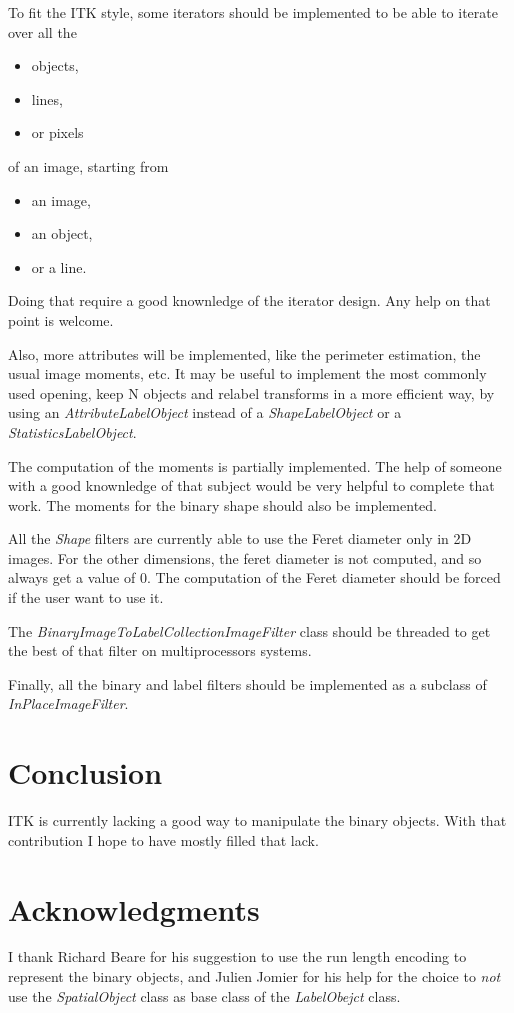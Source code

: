 \documentclass{InsightArticle}
\begin{document}
To fit the ITK style, some iterators should be implemented to be able to iterate
over all the 
\begin{itemize}
  \item objects,
  \item lines,
  \item or pixels
\end{itemize}

of an image, starting from 
\begin{itemize}
  \item an image,
  \item an object,
  \item or a line.
\end{itemize}

Doing that require a good knownledge of the iterator design. Any help on that point is
welcome.

Also, more attributes will be implemented, like the perimeter estimation, the usual image moments, etc. It may be useful to implement the most commonly used opening, keep N objects and relabel transforms in a more efficient way, by using an {\em AttributeLabelObject} instead of a {\em ShapeLabelObject} or a {\em StatisticsLabelObject}.

The computation of the moments is partially implemented. The help of someone with a good knownledge of that subject would be very helpful to complete that work. The moments for the binary shape should also be implemented.

All the {\em Shape} filters are currently able to use the Feret diameter only in 2D images. For the other dimensions, the feret diameter is not computed, and so always get a value of $0$. The computation of the Feret diameter should be forced if the user want to use it.

The {\em BinaryImageToLabelCollectionImageFilter} class should be threaded to get the best of that filter on multiprocessors systems.

Finally, all the binary and label filters should be implemented as a subclass of {\em InPlaceImageFilter}.

\section{Conclusion}

ITK is currently lacking a good way to manipulate the binary objects. With that contribution I hope to have mostly
filled that lack.

\section{Acknowledgments}
I thank Richard Beare for his suggestion to use the run length encoding to represent the binary objects, and Julien Jomier for his help for the choice to {\em not} use the {\em SpatialObject} class as base class of the {\em LabelObejct} class.
\end{document}
